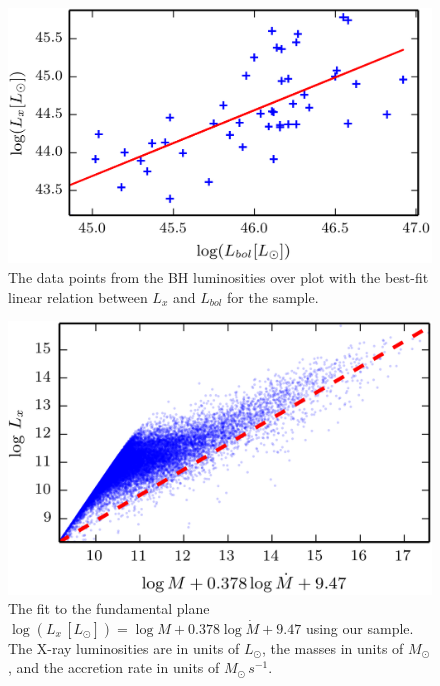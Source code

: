 \begin{figure}
\centering{}\includegraphics[clip]{Figures/elvis_template} \protect\caption{\label{fig:Elvis_template}The data points from the BH luminosities
over plot with the best-fit linear relation between $L_{x}$ and $L_{bol}$
for the sample.}
\end{figure}
\begin{figure}
\begin{centering}
\includegraphics{Figures/fp_fit}
\par\end{centering}

\protect\caption{\label{fig:q_nr_hist}The fit to the fundamental plane
$\log\left(L_x\,[L_\odot]\right) = \log M+0.378\log\dot{{M}}+9.47$ using our sample. The
X-ray luminosities are in units of $L_\odot$, the masses in units of $M_\odot$, and the
accretion rate in units of $M_{\odot}\,s^{-1}$.}
\end{figure}
